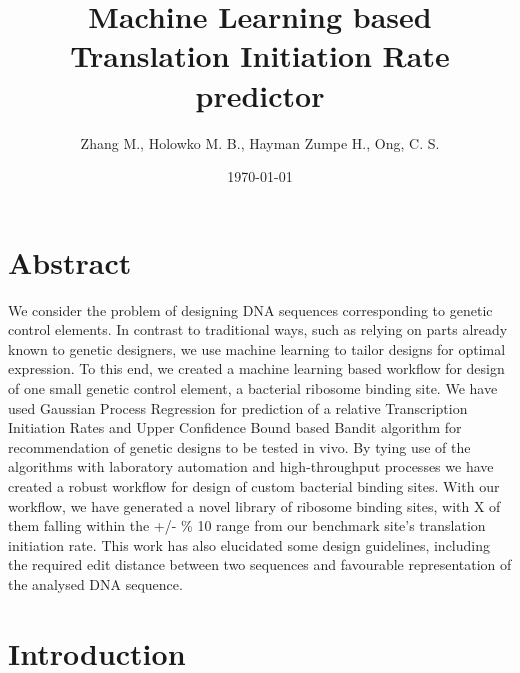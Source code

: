 \documentclass{article}
\title{Machine Learning based Translation Initiation Rate predictor}
\author{Zhang M., Holowko M. B., Hayman Zumpe H., Ong, C. S.}
\date{\today{}}
\begin{document}
\maketitle

\section{Abstract}

We consider the problem of designing DNA sequences corresponding to genetic control elements. 
In contrast to traditional ways, such as relying on parts already known to genetic designers, we use machine learning to tailor designs for optimal expression.
To this end, we created a machine learning based workflow for design of one small genetic control element, a bacterial ribosome binding site.
We have used Gaussian Process Regression for prediction of a relative Transcription Initiation Rates and Upper Confidence Bound based Bandit algorithm for recommendation of genetic designs to be tested in vivo.
By tying use of the algorithms with laboratory automation and high-throughput processes we have created a robust workflow for design of custom bacterial binding sites.
With our workflow, we have generated a novel library of ribosome binding sites, with X of them falling within the +/- \% 10 range from our benchmark site's translation initiation rate.
This work has also elucidated some design guidelines, including the required edit distance between two sequences and favourable representation of the analysed DNA sequence.


\section{Introduction}
\end{document}

